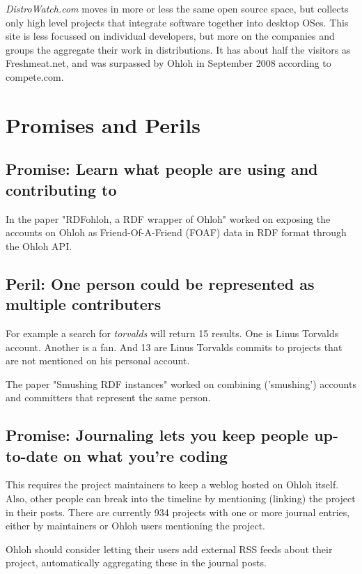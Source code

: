 \documentclass{sig-alternate}
\begin{document}
\emph{DistroWatch.com} moves in more or less the same open source space, but collects only high level projects that integrate software together into desktop OSes. This site is less focussed on individual developers, but more on the companies and groups the aggregate their work in distributions. It has about half the visitors as Freshmeat.net, and was surpassed by Ohloh in September 2008 according to compete.com.


\section{Promises and Perils}


\subsection{Promise: Learn what people are using and contributing to}
In the paper "RDFohloh, a RDF wrapper of Ohloh" \cite{Fernandez:2008p4488}  worked on exposing the accounts on Ohloh as
Friend-Of-A-Friend (FOAF) data in RDF format through the Ohloh API.


\subsection{Peril: One person could be represented as multiple contributers}

For example a search for \emph{torvalds} will return 15 results. One is Linus Torvalds account. Another is a fan. And 13 are Linus Torvalds commits to projects that are not mentioned on his personal account.

The paper "Smushing RDF instances" \cite{Shi:2008p4464} worked on combining ('smushing') accounts and committers that represent the same person.


\subsection{Promise: Journaling lets you keep people up-to-date on what you're coding}
This requires the project maintainers to keep a weblog hosted on Ohloh itself. Also, other people can break into the timeline by mentioning (linking) the project in their posts. There are currently 934 projects with one or more journal entries, either by maintainers or Ohloh users mentioning the project.

Ohloh should consider letting their users add external RSS feeds about their project, automatically aggregating these in the journal posts.
\end{document}

